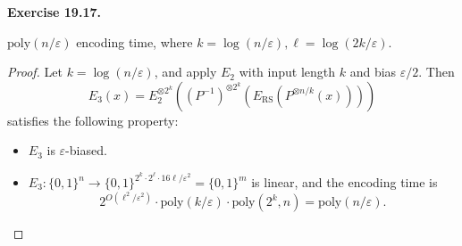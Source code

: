 \documentclass[a4paper]{article}
\newenvironment{exercise}[1]{
	\par
	\noindent\textbf{Exercise #1.}\quad
}{
	\par
	\bigskip
}
\newcommand{\pbra}[1]{\left( #1 \right)}
\newcommand{\bin}{\{0,1\}}
\newcommand{\eps}{\varepsilon}
\newcommand{\poly}{\text{poly}}
\begin{document}
\begin{exercise}{19.17}
\begin{itemize}
\begin{itemize}
                        $\poly(n/\eps)$ encoding time, where $k=\log(n/\eps),\ell=\log(2k/\eps)$.
                        \begin{proof}
                        Let $k=\log(n/\eps)$, and apply $E_2$ with input length $k$ and bias $\eps/2$. Then 
                            $$
                            E_3(x)=E_2^{\otimes 2^k}\pbra{(P^{-1})^{\otimes 2^k}\pbra{E_\text{RS}\pbra{P^{\otimes n/k}(x)}}}
                            $$ 
                            satisfies the following property:
                            \begin{itemize}
                                \item $E_3$ is $\eps$-biased.                            
                                \item $E_3:\bin^n\to\bin^{2^k\cdot 2^\ell\cdot16\ell/\eps^2}=\bin^m$ is linear, 
                                    and the encoding time is 
                                    $$
                                    2^{O(\ell^2/\eps^2)}\cdot\poly(k/\eps)\cdot\poly(2^k,n)=\poly(n/\eps).
                                    $$
                            \end{itemize}
                        \end{proof}
                \end{itemize}
        \end{itemize}
    \end{exercise}
\end{document}
